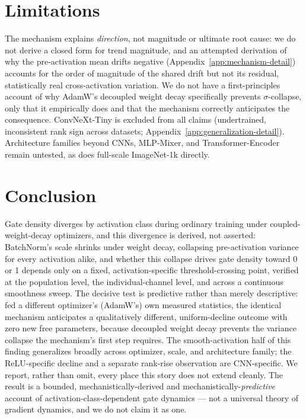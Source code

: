 \documentclass{article}
\begin{document}
\section{Limitations}
\label{sec:limitations}

The mechanism explains \emph{direction}, not magnitude or ultimate root cause: we do not derive a closed form for trend magnitude, and an attempted derivation of why the pre-activation mean drifts negative (Appendix~\ref{app:mechanism-detail}) accounts for the order of magnitude of the shared drift but not its residual, statistically real cross-activation variation. We do not have a first-principles account of why AdamW's decoupled weight decay specifically prevents $\sigma$-collapse, only that it empirically does and that the mechanism correctly anticipates the consequence. ConvNeXt-Tiny is excluded from all claims (undertrained, inconsistent rank sign across datasets; Appendix~\ref{app:generalization-detail}). Architecture families beyond CNNs, MLP-Mixer, and Transformer-Encoder remain untested, as does full-scale ImageNet-1k directly.

\section{Conclusion}

Gate density diverges by activation class during ordinary training under coupled-weight-decay optimizers, and this divergence is derived, not asserted: BatchNorm's scale shrinks under weight decay, collapsing pre-activation variance for every activation alike, and whether this collapse drives gate density toward 0 or 1 depends only on a fixed, activation-specific threshold-crossing point, verified at the population level, the individual-channel level, and across a continuous smoothness sweep. The decisive test is predictive rather than merely descriptive: fed a different optimizer's (AdamW's) own measured statistics, the identical mechanism anticipates a qualitatively different, uniform-decline outcome with zero new free parameters, because decoupled weight decay prevents the variance collapse the mechanism's first step requires. The smooth-activation half of this finding generalizes broadly across optimizer, scale, and architecture family; the ReLU-specific decline and a separate rank-rise observation are CNN-specific. We report, rather than omit, every place this story does not extend cleanly. The result is a bounded, mechanistically-derived and mechanistically-\emph{predictive} account of activation-class-dependent gate dynamics --- not a universal theory of gradient dynamics, and we do not claim it as one.
\end{document}
